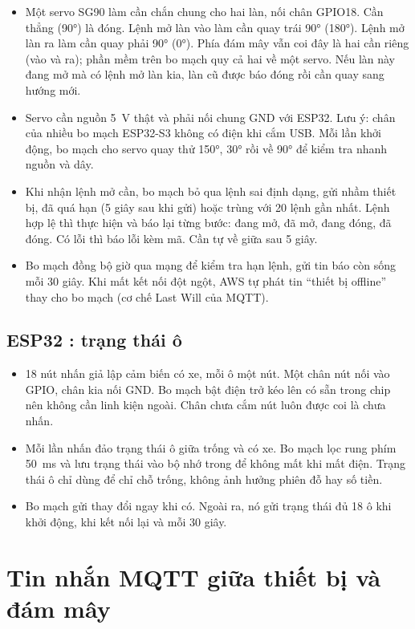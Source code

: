 \begin{itemize}
  \item Một servo SG90 làm cần chắn chung cho hai làn, nối chân GPIO18. Cần thẳng (90°) là đóng. Lệnh mở làn vào làm cần quay trái 90° (180°). Lệnh mở làn ra làm cần quay phải 90° (0°). Phía đám mây vẫn coi đây là hai cần riêng (vào và ra); phần mềm trên bo mạch quy cả hai về một servo. Nếu làn này đang mở mà có lệnh mở làn kia, làn cũ được báo đóng rồi cần quay sang hướng mới.
  \item Servo cần nguồn 5~V thật và phải nối chung GND với ESP32. Lưu ý: chân  của nhiều bo mạch ESP32-S3 không có điện khi cắm USB. Mỗi lần khởi động, bo mạch cho servo quay thử 150°, 30° rồi về 90° để kiểm tra nhanh nguồn và dây.
  \item Khi nhận lệnh mở cần, bo mạch bỏ qua lệnh sai định dạng, gửi nhầm thiết bị, đã quá hạn (5 giây sau khi gửi) hoặc trùng với 20 lệnh gần nhất. Lệnh hợp lệ thì thực hiện và báo lại từng bước: đang mở, đã mở, đang đóng, đã đóng. Có lỗi thì báo lỗi kèm mã. Cần tự về giữa sau 5 giây.
  \item Bo mạch đồng bộ giờ qua mạng để kiểm tra hạn lệnh, gửi tin báo còn sống mỗi 30 giây. Khi mất kết nối đột ngột, AWS tự phát tin ``thiết bị offline'' thay cho bo mạch (cơ chế Last Will của MQTT).
\end{itemize}

\subsection{ESP32 : trạng thái ô}

\begin{itemize}
  \item 18 nút nhấn giả lập cảm biến có xe, mỗi ô một nút. Một chân nút nối vào GPIO, chân kia nối GND. Bo mạch bật điện trở kéo lên có sẵn trong chip nên không cần linh kiện ngoài. Chân chưa cắm nút luôn được coi là chưa nhấn.
  \item Mỗi lần nhấn đảo trạng thái ô giữa trống và có xe. Bo mạch lọc rung phím 50~ms và lưu trạng thái vào bộ nhớ trong để không mất khi mất điện. Trạng thái ô chỉ dùng để chỉ chỗ trống, không ảnh hưởng phiên đỗ hay số tiền.
  \item Bo mạch gửi thay đổi ngay khi có. Ngoài ra, nó gửi trạng thái đủ 18 ô khi khởi động, khi kết nối lại và mỗi 30 giây.
\end{itemize}

\section{Tin nhắn MQTT giữa thiết bị và đám mây}
\label{sec:mqtt}


